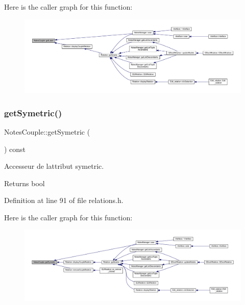 Here is the caller graph for this function\+:\nopagebreak
\begin{figure}[H]
\begin{center}
\leavevmode
\includegraphics[width=350pt]{class_notes_couple_a7ea47703a7ae6e11c46a2078bfc90924_icgraph}
\end{center}
\end{figure}
\mbox{\label{class_notes_couple_ad27081ad94a661ab624670062664a6bd}} 
\subsubsection{\texorpdfstring{get\+Symetric()}{getSymetric()}}
{\footnotesize\ttfamily Notes\+Couple\+::get\+Symetric (\begin{DoxyParamCaption}{ }\end{DoxyParamCaption}) const\hspace{0.3cm}{\ttfamily [inline]}}



Accesseur de l\textquotesingle{}attribut symetric. 

\begin{DoxyReturn}{Returns}
bool 
\end{DoxyReturn}


Definition at line 91 of file relations.\+h.

Here is the caller graph for this function\+:\nopagebreak
\begin{figure}[H]
\begin{center}
\leavevmode
\includegraphics[width=350pt]{class_notes_couple_ad27081ad94a661ab624670062664a6bd_icgraph}
\end{center}
\end{figure}
\mbox{\label{class_notes_couple_a771299450dc621f021e1a9a2cc066a02}} 
